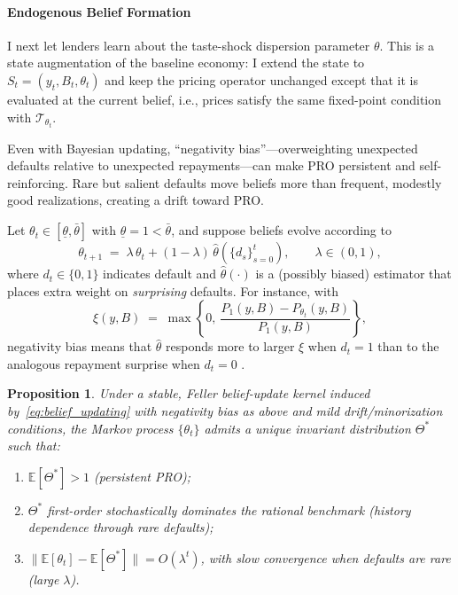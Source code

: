 \documentclass[12pt]{article}
\theoremstyle{plain}
\newtheorem{proposition}{Proposition}
\newcommand{\E}{\mathbb{E}}
\begin{document}
\paragraph{Endogenous Belief Formation}
I next let lenders learn about the taste-shock dispersion parameter $\theta$.
This is a state augmentation of the baseline economy: I extend the state to
$S_t=(y_t,B_t,\theta_t)$ and keep the pricing operator unchanged except that it
is evaluated at the current belief, i.e., prices satisfy the same fixed-point
condition with $\mathcal T_{\theta_t}$.

Even with Bayesian updating, ``negativity bias''---overweighting unexpected
defaults relative to unexpected repayments---can make PRO persistent and
self-reinforcing. Rare but salient defaults move beliefs more than frequent,
modestly good realizations, creating a drift toward PRO.

Let $\theta_t\in[\underline\theta,\bar\theta]$ with
$\underline\theta=1<\bar\theta$, and suppose beliefs evolve according to
\begin{equation}
	\theta_{t+1}\;=\; \lambda\,\theta_t + (1-\lambda)\,\widehat\theta(\{d_s\}_{s=0}^t),
	\qquad \lambda\in(0,1),
	\label{eq:belief_updating}
\end{equation}
where $d_t\in\{0,1\}$ indicates default and $\widehat\theta(\cdot)$ is a (possibly biased) estimator that places extra weight on \emph{surprising} defaults. For instance, with
\begin{equation}
	\xi(y,B)\;=\;\max\!\left\{0,\ \frac{P_1(y,B)-P_{\theta_t}(y,B)}{P_1(y,B)}\right\},
	\label{eq:surprise_intensity}
\end{equation}
negativity bias means that $\widehat\theta$ responds more to larger $\xi$ when $d_t=1$ than to the analogous repayment surprise when $d_t=0$  \citet{BaumeisterBratslavskyFinkenauer2001,BordaloGennaioliShleifer2018}.

\begin{proposition}\label{prop:endogenous_beliefs}
	Under a stable, Feller belief-update kernel induced by~\eqref{eq:belief_updating} with negativity bias as above and mild drift/minorization conditions, the Markov process $\{\theta_t\}$ admits a unique invariant distribution $\Theta^*$ such that:
	\begin{enumerate}
		\item[\textbf{(i)}] $\E[\Theta^*]>1$ (persistent PRO);
		\item[\textbf{(ii)}] $\Theta^*$ first-order stochastically dominates the rational benchmark (history dependence through rare defaults);
		\item[\textbf{(iii)}] $\|\E[\theta_t]-\E[\Theta^*]\|=O(\lambda^t)$, with slow convergence when defaults are rare (large $\lambda$).
	\end{enumerate}
\end{proposition}
\end{document}
